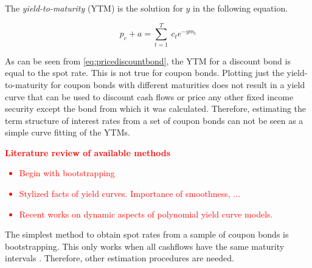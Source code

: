 The \emph{yield-to-maturity} (YTM) is the solution for $y$ in the following equation.

\begin{equation}
   \label{yield}
   p_c+a=\sum_{t=1}^T \ c_t e^{-ym_t}
 \end{equation}

As can be seen from \eqref{eq:pricediscountbond}, the YTM for a discount bond is equal to the spot rate. This is not true for coupon bonds. Plotting just the yield-to-maturity for coupon bonds with different maturities does not result in a yield curve that can be used to discount cash flows or price any other fixed income security except the bond from which it was calculated. Therefore, estimating the term structure of interest rates from a set of coupon bonds can not be seen as a simple curve fitting of the YTMs.

\textcolor{red}{\textbf{Literature review of available methods}
    \begin{itemize}
    \item Begin with bootstrapping
    \item Stylized facts of yield curves. Importance of smoothness, ...
    \item Recent works on dynamic aspects of polynomial yield curve models.
    \end{itemize}
}


The simplest method to obtain spot rates from a sample of coupon bonds is bootstrapping. This only works when all cashflows have the same maturity intervals \citep[see, e.g.][]{Hagan2006}. Therefore, other estimation procedures are needed.







